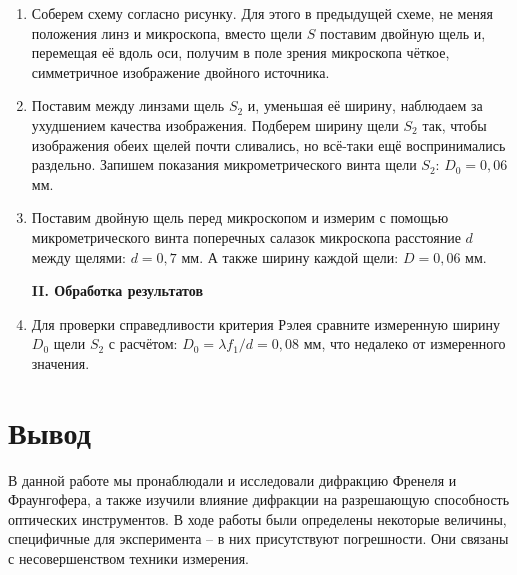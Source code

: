 \documentclass[a4paper,12pt]{article} %
\begin{document}
	\begin{enumerate}
		\item Соберем схему согласно рисунку. Для этого в предыдущей схеме, не меняя положения линз и микроскопа, вместо щели $S$ поставим
двойную щель и, перемещая её вдоль оси, получим в поле зрения микроскопа чёткое, симметричное изображение двойного источника.
		
		\item Поставим между линзами щель $S_2$ и, уменьшая её ширину, наблюдаем за ухудшением качества изображения. Подберем ширину щели $S_2$ так, чтобы изображения обеих щелей почти сливались, но всё-таки ещё воспринимались раздельно. Запишем показания микрометрического винта щели $S_2$: $D_0 = 0,06$ мм.
		
		\item Поставим двойную щель перед микроскопом и измерим с помощью микрометрического винта поперечных салазок микроскопа расстояние $d$ между щелями: $d = 0,7$ мм. А также ширину каждой щели: $D = 0,06$ мм.
		
		
		\begin{center}
			\textbf{II. Обработка результатов}
		\end{center}
	
		\item Для проверки справедливости критерия Рэлея сравните измеренную ширину $D_0$ щели $S_2$ с расчётом: $D_0 = \lambda f_1 / d = 0,08$ мм, что недалеко от измеренного значения.
	\end{enumerate}
	
	
	\vspace{15mm}
	\section*{Вывод}
	В данной работе мы пронаблюдали и исследовали дифракцию Френеля и Фраунгофера, а также изучили влияние дифракции на разрешающую способность оптических инструментов. В ходе работы были определены некоторые величины, специфичные для эксперимента -- в них присутствуют погрешности. Они связаны с несовершенством техники измерения.

	
\end{document}
